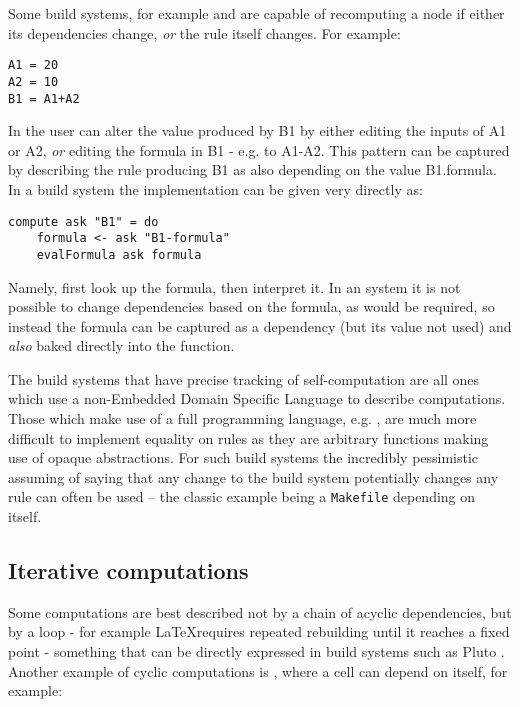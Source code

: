Some build systems, for example \Excel and \Ninja are capable of recomputing a node if either its dependencies change, \textit{or} the rule itself changes. For example:

\begin{verbatim}
A1 = 20
A2 = 10
B1 = A1+A2
\end{verbatim}

In \Excel the user can alter the value produced by \textsf{B1} by either editing the inputs of \textsf{A1} or \textsf{A2}, \textit{or} editing the formula in \textsf{B1} - e.g. to \textsf{A1-A2}. This pattern can be captured by describing the rule producing \textsf{B1} as also depending on the value \textsf{B1.formula}. In a  build system the implementation can be given very directly as:

\begin{verbatim}
compute ask "B1" = do
    formula <- ask "B1-formula"
    evalFormula ask formula
\end{verbatim}

Namely, first look up the formula, then interpret it. In an  system it is not possible to change dependencies based on the formula, as would be required, so instead the formula can be captured as a dependency (but its value not used) and \textit{also} baked directly into the  function.

The build systems that have precise tracking of self-computation are all ones which use a non-Embedded Domain Specific Language to describe computations. Those which make use of a full programming language, e.g. \Shake, are much more difficult to implement equality on rules as they are arbitrary functions making use of opaque abstractions. For such build systems the incredibly pessimistic assuming of saying that any change to the build system potentially changes any rule can often be used -- the classic example being a \texttt{Makefile} depending on itself.

\subsection{Iterative computations}\label{sec-iterative-compute}

Some computations are best described not by a chain of acyclic dependencies, but by a loop - for example \LaTeX requires repeated rebuilding until it reaches a fixed point - something that can be directly expressed in build systems such as Pluto \cite{pluto}. Another example of cyclic computations is \Excel, where a cell can depend on itself, for example:

